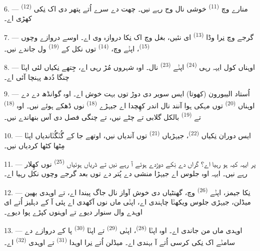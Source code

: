 6. --- منارے وچ  \textsuperscript{(11)} خوشی نال وج رہے نیں۔ چھت دے
سرے اُتے پتھر دی اک نِکی  \textsuperscript{(12)} کھڑی اے۔

7. --- گرجے وچ نِرا وڈا  \textsuperscript{(13)} ای نئیں، بغل وچ اک
نِکا دروازہ وی اے۔ اوسے دروازے وچوں  \textsuperscript{(15)}، اپݨے
 وچ،  \textsuperscript{(14)} توں نکل کے
 \textsuperscript{(19)} ول جاندے نیں۔

8. --- اوہناں کول ایہہ رہی  \textsuperscript{(24)} اپݨے
 \textsuperscript{(23)} نال۔ اوہ شہروں مُڑ رہی اے، جِتھے نِکیاں لئی
اپݨا چنگا دُدھ پہنچا آئی اے۔

\VUsaut{4.0mm}
\VUsaut{3.4mm}

9. --- اُستاد الیبورون (کھوتا) ایس سویر دی دوڑ توں بہت خوش اے۔ اوہ گوانڈھ دے
 دے اوہناں  \textsuperscript{(20)} توں مہکی ہوا آنند
نال اندر کھِچدا اے جیہڑے  \textsuperscript{(18)} نوں
ڈھکے ہوئے نیں۔ اوہ  \textsuperscript{(18)} تے
 \textsuperscript{(19)} بالکل گلابی تے چٹے نیں، تے چنگی
فصل دی آس بنھاندے نیں۔

10. --- ایس دوران نِکیاں  \textsuperscript{(22)}، جیہڑیاں
 \textsuperscript{(21)} توں آندیاں نیں، اوتھے جا کے گُݨگُݨاندیاں
اپݨا مِٹھا  کٹھا کردیاں نیں۔

11. --- پر ایہہ کیہ ہو رہیا اے؟ گراں دے نِکے دوڑدے ہوئے آ رہے نیں تے ڈریاں
ہوئیاں  \textsuperscript{(25)} نوں کھِلار رہے نیں۔ ایہہ اوہ جلوس اے
جیہڑا منشی دے پُتر دے  توں بعد گرجے وچوں نکل رہیا اے۔

12. --- نِکا جیمز، اپݨے  \textsuperscript{(26)} وچ، گھنٹیاں دی
خوش آواز نال جاگ پیندا اے، تے اوہدی بھین میڈلن، جیہڑی جلوس ویکھݨا چاہندی اے،
اپݨی ماں نوں آکھدی اے پئی آ کے دہلیز اُتے ای اوہدے وال سنوار دیوے تے اوہنوں
کپڑے پوا دیوے۔

13. --- اوہدی ماں من جاندی اے۔ اوہ اپݨا  \textsuperscript{(28)}،
اپݨی  \textsuperscript{(29)} تے اپݨا  \textsuperscript{(30)}
پا کے دروازے دے سامݨے اک نِکی کرسی اُتے آ بہندی اے۔ میڈلن اُتے نِرا اوہدا
 \textsuperscript{(31)} تے اوہدی 
\textsuperscript{(32)} اے۔


